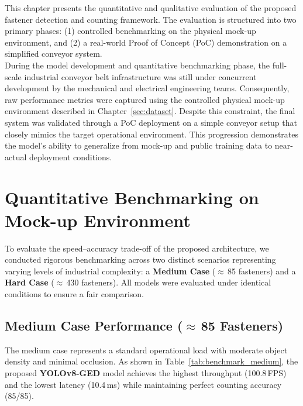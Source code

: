 \label{chap:results}

This chapter presents the quantitative and qualitative evaluation of the proposed fastener detection and counting framework. The evaluation is structured into two primary phases: (1) controlled benchmarking on the physical mock-up environment, and (2) a real-world Proof of Concept (PoC) demonstration on a simplified conveyor system. \\

During the model development and quantitative benchmarking phase, the full-scale industrial conveyor belt infrastructure was still under concurrent development by the mechanical and electrical engineering teams. Consequently, raw performance metrics were captured using the controlled physical mock-up environment described in Chapter~\ref{sec:dataset}. Despite this constraint, the final system was validated through a PoC deployment on a simple conveyor setup that closely mimics the target operational environment. This progression demonstrates the model's ability to generalize from mock-up and public training data to near-actual deployment conditions.

\section{Quantitative Benchmarking on Mock-up Environment}
To evaluate the speed--accuracy trade-off of the proposed architecture, we conducted rigorous benchmarking across two distinct scenarios representing varying levels of industrial complexity: a \textbf{Medium Case} ($\approx$\,85 fasteners) and a \textbf{Hard Case} ($\approx$\,430 fasteners). All models were evaluated under identical conditions to ensure a fair comparison.

\subsection{Medium Case Performance ($\approx$\,85 Fasteners)}
The medium case represents a standard operational load with moderate object density and minimal occlusion. As shown in Table~\ref{tab:benchmark_medium}, the proposed \textbf{YOLOv8-GED} model achieves the highest throughput (100.8\,FPS) and the lowest latency (10.4\,ms) while maintaining perfect counting accuracy (85/85).


